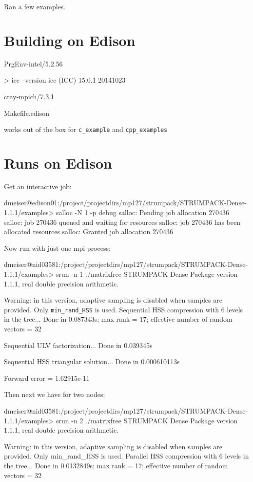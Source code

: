 \documentclass{acmsmall}
\begin{document}
Ran a few examples.


\section{Building on Edison}

PrgEnv-intel/5.2.56

> icc --version
icc (ICC) 15.0.1 20141023

cray-mpich/7.3.1

Makefile.edison

works out of the box for \verb!c_example! and \verb!cpp_examples!



\section{Runs on Edison}

Get an interactive job:


dmeiser@edison01:/project/projectdirs/mp127/strumpack/STRUMPACK-Dense-1.1.1/examples>
salloc -N 1 -p debug
salloc: Pending job allocation 270436
salloc: job 270436 queued and waiting for resources
salloc: job 270436 has been allocated resources
salloc: Granted job allocation 270436


Now run with just one mpi process:


dmeiser@nid03581:/project/projectdirs/mp127/strumpack/STRUMPACK-Dense-1.1.1/examples>
srun -n 1 ./matrixfree
STRUMPACK Dense Package version 1.1.1, real double precision arithmetic.

Warning: in this version, adaptive sampling is disabled when samples are
provided. Only \verb!min_rand_HSS! is used.
Sequential HSS compression with 6 levels in the tree...
Done in 0.087343s; max rank = 17; effective number of random vectors =
32

Sequential ULV factorization...
Done in 0.039345s

Sequential HSS triangular solution...
Done in 0.000610113s

Forward error = 1.62915e-11



Then next we have for two nodes:

dmeiser@nid03581:/project/projectdirs/mp127/strumpack/STRUMPACK-Dense-1.1.1/examples>
srun -n 2 ./matrixfree
STRUMPACK Dense Package version 1.1.1, real double precision arithmetic.

Warning: in this version, adaptive sampling is disabled when samples are
provided. Only min_rand_HSS is used.
Parallel HSS compression with 6 levels in the tree...
Done in 0.0132849s; max rank = 17; effective number of random vectors =
32
\end{document}
